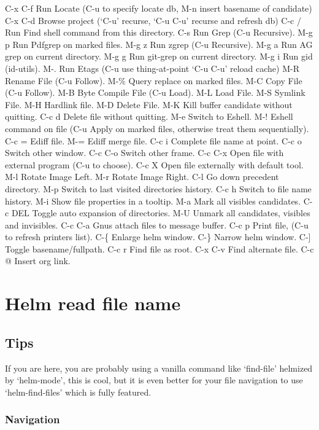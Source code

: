 \documentclass[11pt]{article}
\begin{document}
C-x C-f		Run Locate (C-u to specify locate db, M-n insert basename of candidate)
C-x C-d		Browse project (‘C-u’ recurse, ‘C-u C-u’ recurse and refresh db)
C-c /		Run Find shell command from this directory.
C-s		Run Grep (C-u Recursive).
M-g p		Run Pdfgrep on marked files.
M-g z		Run zgrep (C-u Recursive).
M-g a		Run AG grep on current directory.
M-g g		Run git-grep on current directory.
M-g i		Run gid (id-utils).
M-.		Run Etags (C-u use thing-at-point ‘C-u C-u’ reload cache)
M-R		Rename File (C-u Follow).
M-\%		Query replace on marked files.
M-C		Copy File (C-u Follow).
M-B		Byte Compile File (C-u Load).
M-L		Load File.
M-S		Symlink File.
M-H		Hardlink file.
M-D		Delete File.
M-K		Kill buffer candidate without quitting.
C-c d		Delete file without quitting.
M-e		Switch to Eshell.
M-!		Eshell command on file (C-u Apply on marked files, otherwise treat them sequentially).
C-c =		Ediff file.
M-=		Ediff merge file.
C-c i		Complete file name at point.
C-c o		Switch other window.
C-c C-o		Switch other frame.
C-c C-x		Open file with external program (C-u to choose).
C-c X		Open file externally with default tool.
M-l		Rotate Image Left.
M-r		Rotate Image Right.
C-l		Go down precedent directory.
M-p		Switch to last visited directories history.
C-c h		Switch to file name history.
M-i		Show file properties in a tooltip.
M-a		Mark all visibles candidates.
C-c DEL		Toggle auto expansion of directories.
M-U		Unmark all candidates, visibles and invisibles.
C-c C-a		Gnus attach files to message buffer.
C-c p		Print file, (C-u to refresh printers list).
C-\{		Enlarge helm window.
C-\}		Narrow helm window.
C-]		Toggle basename/fullpath.
C-c r		Find file as root.
C-x C-v		Find alternate file.
C-c @		Insert org link.

\section{Helm read file name}
\label{sec:org7d812f8}

\subsection{Tips}
\label{sec:org150a784}

If you are here, you are probably using a vanilla command like ‘find-file’
helmized by ‘helm-mode’, this is cool, but it is even better for your file
navigation to use ‘helm-find-files’ which is fully featured.

\subsubsection{Navigation}
\label{sec:org38bd0bf}
\end{document}
